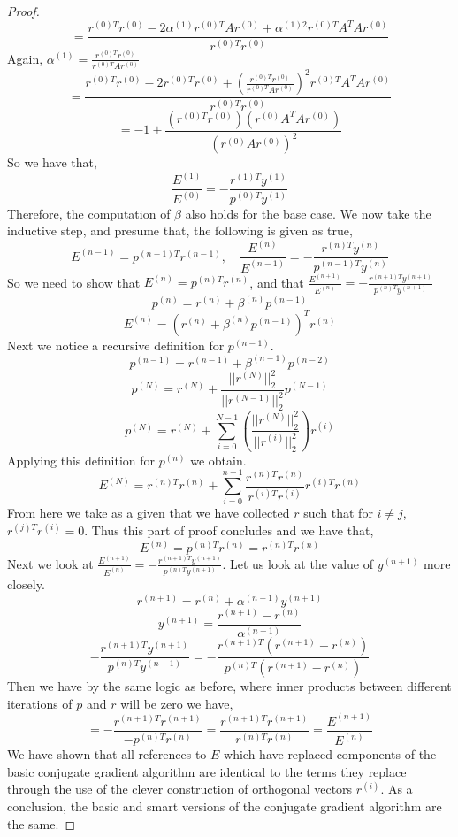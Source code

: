 \documentclass{article}
\begin{document}
\begin{enumerate}
\begin{proof}
        \[
            = \frac{r^{(0)T}r^{(0)} - 2\alpha^{(1)}r^{(0)T}Ar^{(0)} + \alpha^{(1)2}r^{(0)T}A^TAr^{(0)}}{r^{(0)T}r^{(0)}}
        \]
        Again, $\alpha^{(1)} = \frac{r^{(0)T}r^{(0)}}{r^{(0)T}Ar^{(0)}}$
        \[
            =  \frac{r^{(0)T}r^{(0)} - 2r^{(0)T}r^{(0)} + \left(\frac{r^{(0)T}r^{(0)}}{r^{(0)T}Ar^{(0)}}\right)^2r^{(0)T}A^TAr^{(0)}}{r^{(0)T}r^{(0)}}
        \]
        \[
            = -1 + \frac{(r^{(0)T}r^{(0)})(r^{(0)}A^TAr^{(0)})}{(r^{(0)}Ar^{(0)})^2}
        \]
        So we have that, 
        \[
             \frac{E^{(1)}}{E^{(0)}} = -\frac{r^{(1)T}y^{(1)}}{p^{(0)T}y^{(1)}}
        \]
        Therefore, the computation of $\beta$ also holds for the base case. We now take the inductive step, and presume that, the following is given as true, 
        \[
                E^{(n-1)} = p^{(n-1)T}r^{(n-1)}, \quad \frac{E^{(n)}}{E^{(n-1)}} = -\frac{r^{(n)T}y^{(n)}}{p^{(n-1)T}y^{(n)}}
        \]
        So we need to show that $E^{(n)} = p^{(n)T}r^{(n)}$, and that $\frac{E^{(n+1)}}{E^{(n)}} = -\frac{r^{(n+1)T}y^{(n+1)}}{p^{(n)T}y^{(n+1)}}$
        \[
            p^{(n)} = r^{(n)} + \beta^{(n)}p^{(n-1)}
        \]
        \[
            E^{(n)} = (r^{(n)} + \beta^{(n)}p^{(n-1)})^Tr^{(n)}
        \]
        Next we notice a recursive definition for $p^{(n-1)}$. 
        \[
            p^{(n-1)} = r^{(n-1)} + \beta^{(n-1)}p^{(n-2)}
        \]
        \[
            p^{(N)} = r^{(N)} + \frac{||r^{(N)}||_2^2}{||r^{(N-1)}||_2^2}p^{(N-1)}
        \]
        \[
            p^{(N)} = r^{(N)} + \sum_{i=0}^{N-1}\left(\frac{||r^{(N)}||_2^2}{||r^{(i)}||_2^2}\right)r^{(i)}
        \]
        Applying this definition for $p^{(n)}$ we obtain.
        \[
            E^{(N)} = r^{(n)T}r^{(n)} + \sum_{i=0}^{n-1}\frac{r^{(n)T}r^{(n)}}{r^{(i)T}r^{(i)}} r^{(i)T}r^{(n)}
        \]
        From here we take as a given that we have collected $r$ such that for $i\neq j$, $r^{(j)T}r^{(i)} = 0$. Thus this part of proof concludes and we have that, 
        \[
            E^{(n)} = p^{(n)T}r^{(n)} = r^{(n)T}r^{(n)}
        \]
        Next we look at $\frac{E^{(n+1)}}{E^{(n)}} = -\frac{r^{(n+1)T}y^{(n+1)}}{p^{(n)T}y^{(n+1)}}$. Let us look at the value of $y^{(n+1)}$ more closely. 
        \[
            r^{(n+1)} = r^{(n)} + \alpha^{(n+1)}y^{(n+1)}
        \]
        \[
            y^{(n+1)} = \frac{r^{(n+1)} - r^{(n)}}{\alpha^{(n+1)}}
        \]
        \[
            -\frac{r^{(n+1)T}y^{(n+1)}}{p^{(n)T}y^{(n+1)}} = -\frac{r^{(n+1)T}(r^{(n+1)} - r^{(n)})}{p^{(n)T}(r^{(n+1)} - r^{(n)})}
        \]
        Then we have by the same logic as before, where inner products between different iterations of $p$ and $r$ will be zero we have, 
        \[
            = -\frac{r^{(n+1)T}r^{(n+1)}}{-p^{(n)T}r^{(n)}} = \frac{r^{(n+1)T}r^{(n+1)}}{r^{(n)T}r^{(n)}} = \frac{E^{(n+1)}}{E^{(n)}}
        \]
        We have shown that all references to $E$ which have replaced components of the basic conjugate gradient algorithm are identical to the terms they replace through the use of the clever construction of orthogonal vectors $r^{(i)}$. As a conclusion, the basic and smart versions of the conjugate gradient algorithm are the same. 


\end{proof}
\end{enumerate}
\end{document}
